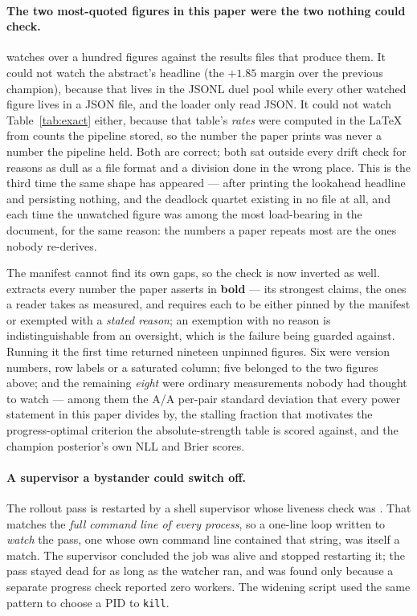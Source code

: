 \documentclass[11pt,letterpaper]{article}
\begin{document}
\paragraph{The two most-quoted figures in this paper were the two nothing could
check.}  watches over a hundred figures
against the results files that produce them. It could not watch the abstract's
headline (the $+1.85$ margin over the previous champion), because that
lives in the JSONL duel pool while every other watched figure lives in a JSON
file, and the loader only read JSON. It could not watch
Table~\ref{tab:exact} either, because that table's \emph{rates} were computed in
the \LaTeX{} from counts the pipeline stored, so the number the paper prints was
never a number the pipeline held. Both are correct; both sat outside every drift
check for reasons as dull as a file format and a division done in the wrong
place. This is the third time the same shape has appeared --- after
 printing the lookahead headline and persisting
nothing, and the deadlock quartet existing in no file at all, and each time
the unwatched figure was among the most load-bearing in the document, for the
same reason: the numbers a paper repeats most are the ones nobody re-derives.

The manifest cannot find its own gaps, so the check is now inverted as well.
 extracts every number the paper asserts
in \textbf{bold} --- its strongest claims, the ones a reader takes as measured,
and requires each to be either pinned by the manifest or exempted with a
\emph{stated reason}; an exemption with no reason is indistinguishable from an
oversight, which is the failure being guarded against. Running it the first
time returned nineteen unpinned figures. Six were version numbers, row labels
or a saturated column; five belonged to the two figures above; and the
remaining \emph{eight} were ordinary measurements nobody had thought to
watch --- among them the A/A per-pair standard deviation that every power
statement in this paper divides by, the stalling fraction that motivates the
progress-optimal criterion the absolute-strength table is scored against, and
the champion posterior's own NLL and Brier scores.

\paragraph{A supervisor a bystander could switch off.} The rollout pass is
restarted by a shell supervisor whose liveness check was
. That matches the
\emph{full command line of every process}, so a one-line loop written to
\emph{watch} the pass, one whose own command line contained that string,
was itself a match. The supervisor concluded the job was alive and stopped
restarting it; the pass stayed dead for as long as the watcher ran, and was
found only because a separate progress check reported zero workers. The
widening script used the same pattern to choose a PID to \texttt{kill}.
\end{document}
